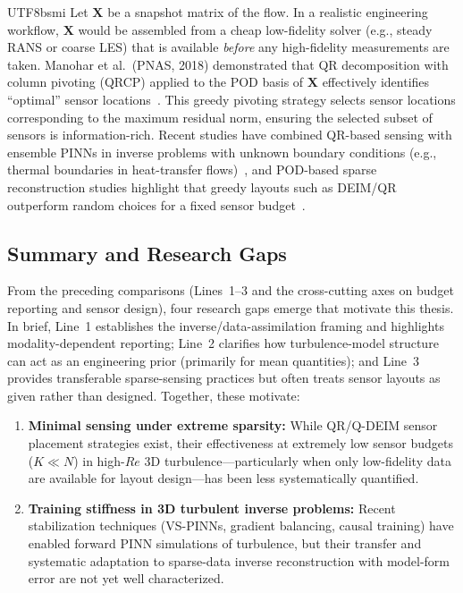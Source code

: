 \documentclass[master]{NTHUthesis}
\begin{document}
\begin{CJK*}{UTF8}{bsmi}
Let $\mathbf{X}$ be a snapshot matrix of the flow. In a realistic engineering workflow, $\mathbf{X}$ would be assembled from a cheap low-fidelity solver (e.g., steady RANS or coarse LES) that is available \emph{before} any high-fidelity measurements are taken. Manohar et al.\ (PNAS, 2018) demonstrated that QR decomposition with column pivoting (QRCP) applied to the POD basis of $\mathbf{X}$ effectively identifies ``optimal'' sensor locations~\cite{Manohar2018PNAS}. This greedy pivoting strategy selects sensor locations corresponding to the maximum residual norm, ensuring the selected subset of sensors is information-rich. Recent studies have combined QR-based sensing with ensemble PINNs in inverse problems with unknown boundary conditions (e.g., thermal boundaries in heat-transfer flows)~\cite{Soibam2024IJHMT}, and POD-based sparse reconstruction studies highlight that greedy layouts such as DEIM/QR outperform random choices for a fixed sensor budget~\cite{fluids4020109, bukowski2025sparse}.

\subsection{Summary and Research Gaps}
\label{sec:lit_summary}
From the preceding comparisons (Lines~1--3 and the cross-cutting axes on budget reporting and sensor design), four research gaps emerge that motivate this thesis. In brief, Line~1 establishes the inverse/data-assimilation framing and highlights modality-dependent reporting; Line~2 clarifies how turbulence-model structure can act as an engineering prior (primarily for mean quantities); and Line~3 provides transferable sparse-sensing practices but often treats sensor layouts as given rather than designed. Together, these motivate:

\begin{enumerate}
    \item \textbf{Minimal sensing under extreme sparsity:} While QR/Q-DEIM sensor placement strategies exist, their effectiveness at extremely low sensor budgets ($K \ll N$) in high-$Re$ 3D turbulence---particularly when only low-fidelity data are available for layout design---has been less systematically quantified.
    
    \item \textbf{Training stiffness in 3D turbulent inverse problems:} Recent stabilization techniques (VS-PINNs, gradient balancing, causal training) have enabled forward PINN simulations of turbulence, but their transfer and systematic adaptation to sparse-data inverse reconstruction with model-form error are not yet well characterized.
    

\end{enumerate}
\end{CJK*}
\end{document}
